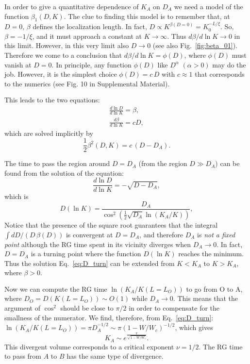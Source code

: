 \documentclass[reprint,aps,prl,superscriptaddress,english,nolongbibliography]{revtex4-1}
\begin{document}
In order to give a quantitative dependence of $K_A$ on $D_A$ we need a model of the function $\beta_1(D,K)$. The clue to finding this model is to remember that, at $D=0$, $\beta$ defines the localization length. In fact, $D\propto K^{\beta(D=0)}=K_0^{-L/\xi}$. So, $\beta=-1/\xi$, and it must approach a constant at $K\rightarrow\infty$. Thus $d\beta/d\ln K\rightarrow 0$ in this limit. However, in this very limit also $D\rightarrow 0$ (see also Fig.~\ref{fig:beta_01}). Therefore we come to a conclusion that 
$d\beta/d\ln K = \phi(D)$, where $\phi(D)$ must vanish at $D=0$.  
In principle, any function $\phi(D)$ like $D^{\alpha}$ $(\alpha>0)$ may do the job. However, it is the simplest choice $\phi(D)=c\,D$ with $c\approx 1$ that corresponds to the numerics (see Fig. 10 in Supplemental Material).
 
This leads to the two equations:
\begin{eqnarray}
    \frac{d\ln D}{d\ln K}=\beta,\\
    \frac{d\beta}{d\ln K}=c D,
\end{eqnarray}
which are solved implicitly by
\begin{equation}
\label{eq:D-DA}
    \frac{1}{2}\beta^2(D,K)=c\,(D-D_{A}).
\end{equation}
   

The time to pass the region around $D=D_A$ (from the region $D\gg D_A$) can be found from the solution of the equation:
\begin{equation}
    \frac{d\ln D}{d\ln K}=-\sqrt{D-D_A},
\end{equation}
which is 
\begin{equation}
    D(\ln K)=\frac{D_A}{\cos^2\left(\frac{1}{2}\sqrt{D_A}\ln(K_A/K)\right)},
\label{eq:D_turn}
\end{equation}
Notice that the presence of the square root guarantees that the integral $\int dD/(D\,\beta(D))$ is convergent at $D=D_{A}$, and therefore  $D_A$ is {\it not a fixed point} although the RG time spent in its vicinity diverges when $D_A\to 0.$ In fact, $D=D_{A}$ is a turning point where the function $D(\ln K)$ reaches the minimum. Thus the solution Eq.~\eqref{eq:D_turn} can be extended from $K<K_A$ to $K>K_A$, where $\beta>0$. 
 

Now we can compute the RG time $\ln(K_A/K(L=L_{O}))$ to go from O to A, where $D_{O}=D(K(L=L_{O}))\sim O(1)$ while $D_A\to 0$. This means that the argument of $\cos^{2}$ should be close to $\pi/2$ in order to compensate for the smallness of the numerator. We find, therefore, from Eq.~\eqref{eq:D_turn}: $\ln(K_{A}/K(L=L_{O}))=\pi D_A^{-1/2}\sim \pi (1-W/W_c)^{-1/2}$, which gives 
\begin{equation}
K_A\sim e^{\frac{\pi}{\sqrt{1-W/W_c}}}. 
\end{equation}
This divergent volume corresponds to a critical exponent $\nu=1/2$. The RG time to pass from $A$ to $B$ has the same type of divergence. 
\end{document}
